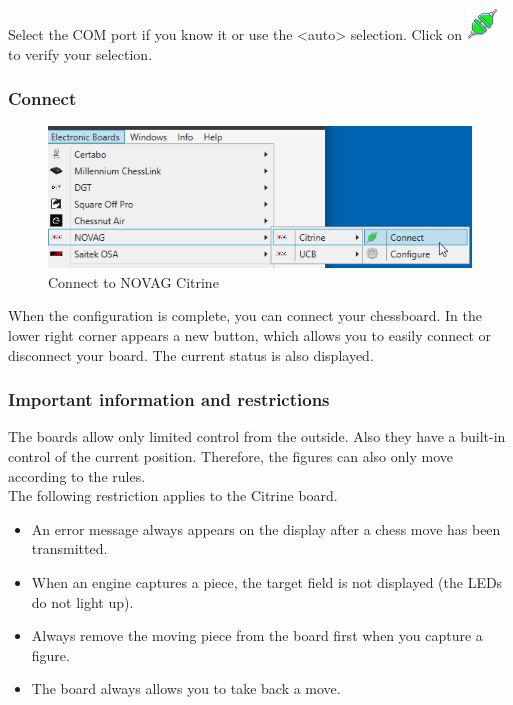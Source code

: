 \documentclass[11pt,a4paper]{article}
\begin{document}
Select the COM port if you know it or use the <auto> selection. 
Click on \includegraphics[scale=0.5]{connect.png} to verify your selection.

\subsubsection{Connect}
\begin{figure}[H]
	\centering
	\includegraphics[scale=0.8]{NovagCitrine3.png}
	\caption{Connect to NOVAG Citrine}
	\label{fig:NovagCitrine3}
\end{figure}
When the configuration is complete, you can connect your chessboard.
In the lower right corner appears a new button, which allows you to easily connect or disconnect your board. The current status is also displayed.

\subsubsection{Important information and restrictions} \label{InformationNovagCitrine}
The boards allow only limited control from the outside. Also they have a built-in control of the current position. Therefore, the figures can also only move according to the rules.\\
The following restriction applies to the Citrine board.

\begin{itemize}
	\item An error message always appears on the display after a chess move has been transmitted.
	\item When an engine captures a piece, the target field is not displayed (the LEDs do not light up).
	\item Always remove the moving piece from the board first when you capture a figure.
	\item The board always allows you to take back a move.
\end{itemize}
\end{document}

